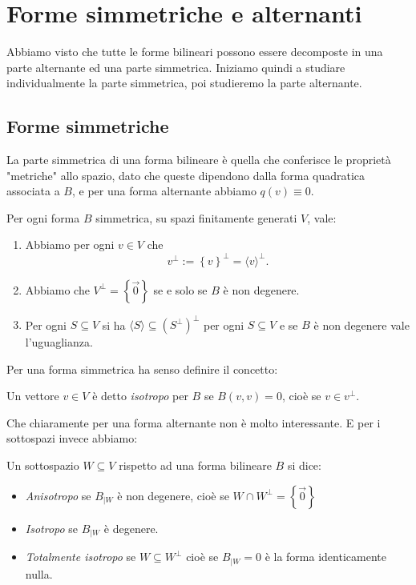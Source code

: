 \documentclass[11pt]{scrartcl}
\begin{document}
	\newpage
	
	\section{Forme simmetriche e alternanti}
	Abbiamo visto che tutte le forme bilineari possono essere decomposte in una parte alternante ed una parte simmetrica. Iniziamo quindi a studiare individualmente la parte simmetrica, poi studieremo la parte alternante. 
	\subsection{Forme simmetriche}
	La parte simmetrica di una forma bilineare è quella che conferisce le proprietà "metriche" allo spazio, dato che queste dipendono dalla forma quadratica associata a $B$, e per una forma alternante abbiamo $q(v)\equiv 0$.
	\begin{proposition}
		Per ogni forma $B$ simmetrica, su spazi finitamente generati $V$, vale:
		\begin{enumerate}
			\item Abbiamo per ogni $v\in V$ che
			$$v^\perp:=\left\{v\right\}^\perp=\langle v\rangle^\perp.$$
			\item Abbiamo che $V^\perp=\left\{\vec{0}\right\}$ se e solo se $B$ è non degenere.
			\item Per ogni $S\subseteq V$ si ha $\langle S\rangle\subseteq \left(S^\perp\right)^\perp$ per ogni $S\subseteq V$ e se $B$ è non degenere vale l'uguaglianza.
		\end{enumerate}
	\end{proposition}
	Per una forma simmetrica ha senso definire il concetto:
	\begin{definition}
		Un vettore $v\in V$ è detto \textit{isotropo} per $B$ se $B(v,v)=0$, cioè se $v\in v^\perp$.
	\end{definition}
	Che chiaramente per una forma alternante non è molto interessante.
	E per i sottospazi invece abbiamo:
	\begin{definition}
		Un sottospazio $W\subseteq V$ rispetto ad una forma bilineare $B$ si dice:
		\begin{itemize}
			\item \textit{Anisotropo} se $B_{\mid W}$ è non degenere, cioè se $W\cap W^\perp=\left\{\vec{0}\right\}$
			\item \textit{Isotropo} se $B_{\mid W}$ è degenere.
			\item \textit{Totalmente isotropo} se $W\subseteq W^\perp$ cioè se $B_{\mid W}=0$ è la forma identicamente nulla.
		\end{itemize}
	\end{definition}
\end{document}
